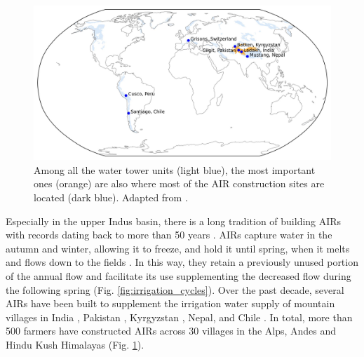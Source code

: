 \begin{figure}[htb]
\centering
\includegraphics[width=\textwidth]{figs/WTUs_AIRs.jpg}

\caption{ Among all the water tower units (light blue), the most important ones (orange) are also where most of
  the AIR construction sites  are located (dark blue). Adapted from
\cite{immerzeelImportanceVulnerabilityWorld2020}.} 

\label{fig:WTUs_AIRs} 
\end{figure}

Especially in the upper Indus basin, there is a long tradition of building \ac{AIRs} with records dating back to
more than 50 years \citep{nusserSociohydrologyArtificialGlaciers2019}. \ac{AIRs} capture water in the autumn and
winter, allowing it to freeze, and hold it until spring, when it melts and flows down to the fields
\citep{ipccChapterHighMountain2019, vinceGlacierMan2009, clouseLadakhArtificialGlaciers2017,
nusserSociohydrologyArtificialGlaciers2019}. In this way, they retain a previously unused portion of the annual
flow and facilitate its use supplementing the decreased flow during the following spring (Fig.
\ref{fig:irrigation_cycles}). Over the past decade, several \ac{AIRs} have been built to supplement the
irrigation water supply of mountain villages in India \citep{wangchukIceStupaCompetition2020,
palmerStoringFrozenWater2022, aggarwalAdaptationClimateChange2021}, Pakistan
\citep{awazproductionIceStupaArtificial2022}, Kyrgyzstan \citep{bbcnewsBrightArtificialGlacier2020}, Nepal, and
Chile \citep{reutersConservationistsChileAim2021}. In total, more than 500 farmers have constructed AIRs across
30 villages in the Alps, Andes and Hindu Kush Himalayas (Fig. \ref{fig:WTUs_AIRs}). 

